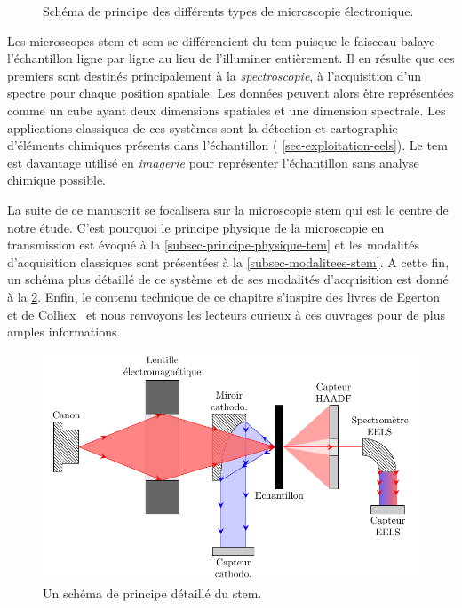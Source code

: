 \begin{figure}[t!]
           \vspace{1em}
       	\caption{Schéma de principe des différents types de microscopie électronique.%
               \protect\label{fig-chap2-micros-electron}}
   \end{figure}

    Les microscopes \gls{stem} et \gls{sem} se différencient du \gls{tem} puisque le faisceau balaye l'échantillon ligne par ligne au lieu de l'illuminer entièrement. Il en résulte que ces premiers sont destinés principalement à la \emph{spectroscopie}, \ie{} à l'acquisition d'un spectre pour chaque position spatiale. Les données peuvent alors être représentées comme un cube ayant deux dimensions spatiales et une dimension spectrale. Les applications classiques de ces systèmes sont la détection et cartographie d'éléments chimiques présents dans l'échantillon (\cf{} \cref{sec-exploitation-eels}). Le \gls{tem} est davantage utilisé en \emph{imagerie} pour représenter l'échantillon sans analyse chimique possible.

    La suite de ce manuscrit se focalisera sur la microscopie \gls{stem} qui est le centre de notre étude. C'est pourquoi le principe physique de la microscopie en transmission est évoqué à la \cref{subsec-principe-physique-tem} et les modalités d'acquisition classiques sont présentées à la \cref{subsec-modalitees-stem}. A cette fin, un schéma plus détaillé de ce système et de ses modalités d'acquisition est donné à la \cref{fig-chap2-stem-detail}. Enfin, le contenu technique de ce chapitre s'inspire des livres de Egerton~\cite{egerton2011electron} et de Colliex~\cite{colliex1998microscopie} et nous renvoyons les lecteurs curieux à ces ouvrages pour de plus amples informations.

    \begin{figure}[htbp]
    	\centering
    	\includegraphics[]{img/chapitre1/figure2/stem-detail.pdf}
    	\caption{Un schéma de principe détaillé du \gls{stem}.
        	\protect\label{fig-chap2-stem-detail}}
    \end{figure}

